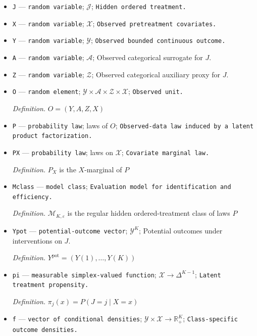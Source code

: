 \documentclass{article}
\begin{document}
\begin{itemize}
  \par\smallskip\noindent\emph{Definition.} \(\mathrm{fold}(i)\) is the held-out fold containing unit \(i\)
  \item \texttt{J} --- \texttt{random variable}; \(\mathcal J\); \texttt{Hidden ordered treatment.}
  \item \texttt{X} --- \texttt{random variable}; \(\mathcal X\); \texttt{Observed pretreatment covariates.}
  \item \texttt{Y} --- \texttt{random variable}; \(\mathcal Y\); \texttt{Observed bounded continuous outcome.}
  \item \texttt{A} --- \texttt{random variable}; \(\mathcal A\); Observed categorical surrogate for \(J\).
  \item \texttt{Z} --- \texttt{random variable}; \(\mathcal Z\); Observed categorical auxiliary proxy for \(J\).
  \item \texttt{O} --- \texttt{random element}; \(\mathcal Y\times\mathcal A\times\mathcal Z\times\mathcal X\); \texttt{Observed unit.}
  \par\smallskip\noindent\emph{Definition.} \(O=(Y,A,Z,X)\)
  \item \texttt{P} --- \texttt{probability law}; laws of \(O\); \texttt{Observed-\allowbreak{}data law induced by a latent product factorization.}
  \item \texttt{PX} --- \texttt{probability law}; laws on \(\mathcal X\); \texttt{Covariate marginal law.}
  \par\smallskip\noindent\emph{Definition.} \(P_X\) is the \(X\)-marginal of \(P\)
  \item \texttt{Mclass} --- \texttt{model class}; \texttt{Evaluation model for identification and efficiency.}
  \par\smallskip\noindent\emph{Definition.} \(\mathcal M_{K,\varepsilon}\) is the regular hidden ordered-treatment class of laws \(P\)
  \item \texttt{Ypot} --- \texttt{potential-\allowbreak{}outcome vector}; \(\mathcal Y^{K}\); Potential outcomes under interventions on \(J\).
  \par\smallskip\noindent\emph{Definition.} \(Y^{\mathrm{pot}}=(Y(1),\ldots,Y(K))\)
  \item \texttt{pi} --- \texttt{measurable simplex-\allowbreak{}valued function}; \(\mathcal X\to\Delta^{K-1}\); \texttt{Latent treatment propensity.}
  \par\smallskip\noindent\emph{Definition.} \(\pi_j(x)=P(J=j\mid X=x)\)
  \item \texttt{f} --- \texttt{vector of conditional densities}; \(\mathcal Y\times\mathcal X\to\mathbb R_{+}^{K}\); \texttt{Class-\allowbreak{}specific outcome densities.}

\end{itemize}
\end{document}

